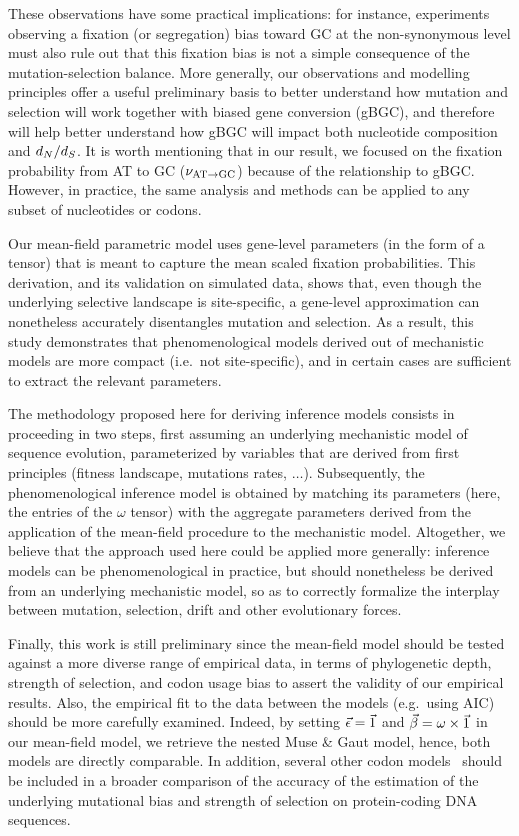These observations have some practical implications: for instance, experiments observing a fixation (or segregation) bias toward GC at the \gls{non-synonymous} level must also rule out that this fixation bias is not a simple consequence of the mutation-selection balance.
More generally, our observations and modelling principles offer a useful preliminary basis to better understand how mutation and selection will work together with biased gene conversion (\acrshort{gBGC}), and therefore will help better understand how \acrshort{gBGC} will impact both nucleotide composition and $d_N / d_S$.
It is worth mentioning that in our result, we focused on the fixation probability from AT to GC ($\nu_{\text{AT} \rightarrow \text{GC}}$) because of the relationship to \acrshort{gBGC}.
However, in practice, the same analysis and methods can be applied to any subset of nucleotides or \glspl{codon}.

Our mean-field parametric model uses gene-level parameters (in the form of a tensor) that is meant to capture the mean scaled fixation probabilities.
This derivation, and its validation on simulated data, shows that, even though the underlying selective landscape is site-specific, a gene-level approximation can nonetheless accurately disentangles mutation and selection.
As a result, this study demonstrates that phenomenological models derived out of mechanistic models are more compact (i.e.~not site-specific), and in certain cases are sufficient to extract the relevant parameters.

The methodology proposed here for deriving inference models consists in proceeding in two steps, first assuming an underlying mechanistic model of sequence evolution, parameterized by variables that are derived from first principles (fitness landscape, mutations rates, $\hdots$).
Subsequently, the phenomenological inference model is obtained by matching its parameters (here, the entries of the $\omega$ tensor) with the aggregate parameters derived from the application of the mean-field procedure to the mechanistic model.
Altogether, we believe that the approach used here could be applied more generally: inference models can be phenomenological in practice, but should nonetheless be derived from an underlying mechanistic model, so as to correctly formalize the interplay between mutation, selection, drift and other evolutionary forces.

Finally, this work is still preliminary since the mean-field model should be tested against a more diverse range of empirical data, in terms of phylogenetic depth, strength of selection, and \gls{codon usage bias} to assert the validity of our empirical results.
Also, the empirical fit to the data between the models (e.g.~using AIC) should be more carefully examined.
Indeed, by setting $\vec{\epsilon} = \vec{1}$ and $\vec{\beta} = \omega \times \vec{1}$ in our mean-field model, we retrieve the nested Muse \& Gaut model, hence, both models are directly comparable.
In addition, several other \gls{codon} models~\citep{Rodrigue2008a,KosakovskyPond2020} should be included in a broader comparison of the accuracy of the estimation of the underlying mutational bias and strength of selection on protein-coding \acrshort{DNA} sequences.



